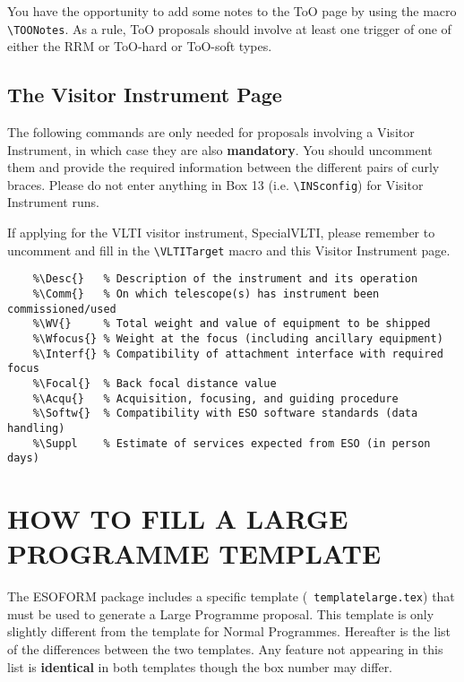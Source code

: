 \documentclass{article}
\begin{document}
You have the opportunity to add some notes to the ToO page by using
the macro \verb|\TOONotes|.
As a rule, ToO proposals should involve at least one trigger
of one of either the RRM or ToO-hard or ToO-soft types.

\subsection{The Visitor Instrument Page}
\label{sec:visins}

The following commands are only needed for proposals involving a Visitor
Instrument, in which case they are also {\bf mandatory}.  You should
uncomment them and provide the required information between the
different pairs of curly braces. Please do not enter anything in Box 13 
(i.e. \verb|\INSconfig|) for Visitor Instrument runs.

If applying for the VLTI visitor instrument, SpecialVLTI, please remember to uncomment
and fill in the \verb|\VLTITarget| macro and this Visitor Instrument page.

\begin{verbatim}
    %\Desc{}   % Description of the instrument and its operation
    %\Comm{}   % On which telescope(s) has instrument been commissioned/used
    %\WV{}     % Total weight and value of equipment to be shipped
    %\Wfocus{} % Weight at the focus (including ancillary equipment)
    %\Interf{} % Compatibility of attachment interface with required focus
    %\Focal{}  % Back focal distance value
    %\Acqu{}   % Acquisition, focusing, and guiding procedure
    %\Softw{}  % Compatibility with ESO software standards (data handling)
    %\Suppl    % Estimate of services expected from ESO (in person days)
\end{verbatim}


\section{HOW TO FILL A LARGE PROGRAMME TEMPLATE}
\label{sec:large}

The ESOFORM package includes a specific template ({\tt
  templatelarge.tex}) that must be used to generate a Large Programme
proposal. This template is only slightly different from the
template for Normal Programmes. Hereafter is the list of the
differences between the two templates. Any feature not appearing in
this list is {\bf identical} in both templates though the box number
may differ.
\end{document}
